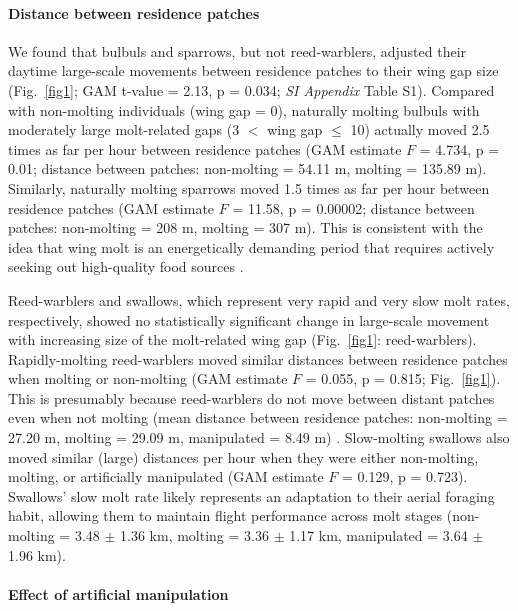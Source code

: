 \begin{refsection}
\paragraph*{Distance between residence patches}

We found that bulbuls and sparrows, but not reed-warblers, adjusted their daytime large-scale movements between residence patches to their wing gap size (Fig.~\ref{fig1}; GAM t-value = 2.13, p = 0.034; \textit{SI Appendix} Table S1).
Compared with non-molting individuals (wing gap = 0), naturally molting bulbuls with moderately large molt-related gaps (3 $<$ wing gap $\leq$ 10) actually moved 2.5 times as far per hour between residence patches (GAM estimate $F$ = 4.734, p = 0.01; distance between patches: non-molting = 54.11 m, molting = 135.89 m).
Similarly, naturally molting sparrows moved {1.5 times} as far per hour between residence patches (GAM estimate $F$ = 11.58, p = 0.00002; distance between patches: non-molting = 208 m, molting = 307 m).
This is consistent with the idea that wing molt is an energetically demanding period that requires actively seeking out high-quality food sources \citep{madsen1987a,fox1998}.

Reed-warblers and swallows, which represent very rapid and very slow molt rates, respectively, showed no statistically significant change in large-scale movement with increasing size of the molt-related wing gap (Fig.~\ref{fig1}: reed-warblers).
Rapidly-molting reed-warblers moved similar distances between residence patches when molting or non-molting (GAM estimate $F$ = 0.055, p = 0.815; Fig.~\ref{fig1}).
This is presumably because reed-warblers 
do not move between distant patches even when not molting (mean distance between residence patches: non-molting = 27.20 m, molting = 29.09 m, manipulated = 8.49 m) \citep{kiat2016}.
Slow-molting swallows also moved similar (large) distances per hour when they were either non-molting, molting, or artificially manipulated (GAM estimate $F$ = 0.129, p = 0.723).
Swallows' slow molt rate likely represents an adaptation to their aerial foraging habit, allowing them to maintain flight performance across molt stages (non-molting = 3.48 $\pm$ 1.36 km, molting = 3.36 $\pm$ 1.17 km, manipulated = 3.64 $\pm$ 1.96 km).

\paragraph*{Effect of artificial manipulation}


\end{refsection}
